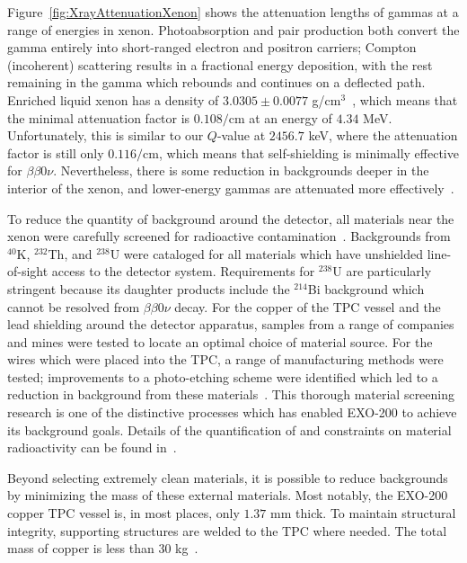 Figure~\ref{fig:XrayAttenuationXenon} shows the attenuation lengths of gammas at a range of energies in xenon.  Photoabsorption and pair production both convert the gamma entirely into short-ranged electron and positron carriers; Compton (incoherent) scattering results in a fractional energy deposition, with the rest remaining in the gamma which rebounds and continues on a deflected path.  Enriched liquid xenon has a density of $3.0305 \pm 0.0077$ g/cm$^3$~\cite{bb2nEXO2014}, which means that the minimal attenuation factor is $0.108/\text{cm}$ at an energy of $4.34$ MeV.  Unfortunately, this is similar to our $Q$-value at $2456.7$ keV, where the attenuation factor is still only $0.116/\text{cm}$, which means that self-shielding is minimally effective for $\beta\beta 0\nu$.  Nevertheless, there is some reduction in backgrounds deeper in the interior of the xenon, and lower-energy gammas are attenuated more effectively~\cite{XcomXenonAttenuation}.

To reduce the quantity of background around the detector, all materials near the xenon were carefully screened for radioactive contamination~\cite{MaterialsCatalog}.  Backgrounds from $^{40}$K, $^{232}$Th, and $^{238}$U were cataloged for all materials which have unshielded line-of-sight access to the detector system.  Requirements for $^{238}$U are particularly stringent because its daughter products include the $^{214}$Bi background which cannot be resolved from $\beta\beta 0\nu$ decay.  For the copper of the TPC vessel and the lead shielding around the detector apparatus, samples from a range of companies and mines were tested to locate an optimal choice of material source.  For the wires which were placed into the TPC, a range of manufacturing methods were tested; improvements to a photo-etching scheme were identified which led to a reduction in background from these materials~\cite{detectorPartI}.  This thorough material screening research is one of the distinctive processes which has enabled EXO-200 to achieve its background goals.  Details of the quantification of and constraints on material radioactivity can be found in~\cite{MaterialsCatalog}.

Beyond selecting extremely clean materials, it is possible to reduce backgrounds by minimizing the mass of these external materials.  Most notably, the EXO-200 copper TPC vessel is, in most places, only $1.37$ mm thick. To maintain structural integrity, supporting structures are welded to the TPC where needed. The total mass of copper is less than $30$ kg~\cite{detectorPartI}.


